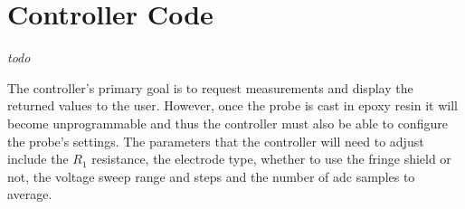\section{Controller Code}

\textit{todo}

The controller's primary goal is to request measurements and display the returned values to the user.
However, once the probe is cast in epoxy resin it will become unprogrammable and thus the controller must also be able to configure the probe's settings.
The parameters that the controller will need to adjust include the $R_1$ resistance, the electrode type, whether to use the fringe shield or not, the voltage sweep range and steps and the number of \gls{adc} samples to average.